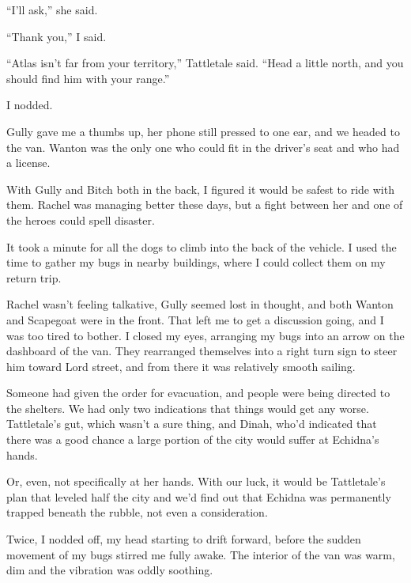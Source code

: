 ``I'll ask,'' she said.



``Thank you,'' I said.



``Atlas isn't far from your territory,'' Tattletale said.  ``Head a little north, and you should find him with your range.''



I nodded.



Gully gave me a thumbs up, her phone still pressed to one ear, and we headed to the van.  Wanton was the only one who could fit in the driver's seat and who had a license.



With Gully and Bitch both in the back, I figured it would be safest to ride with them.  Rachel was managing better these days, but a fight between her and one of the heroes could spell disaster.



It took a minute for all the dogs to climb into the back of the vehicle.  I used the time to gather my bugs in nearby buildings, where I could collect them on my return trip.



Rachel wasn't feeling talkative, Gully seemed lost in thought, and both Wanton and Scapegoat were in the front.  That left me to get a discussion going, and I was too tired to bother.  I closed my eyes, arranging my bugs into an arrow on the dashboard of the van.  They rearranged themselves into a right turn sign to steer him toward Lord street, and from there it was relatively smooth sailing.



Someone had given the order for evacuation, and people were being directed to the shelters.  We had only two indications that things would get any worse.  Tattletale's gut, which wasn't a sure thing, and Dinah, who'd indicated that there was a good chance a large portion of the city would suffer at Echidna's hands.



Or, even, not specifically at her hands.  With our luck, it would be Tattletale's plan that leveled half the city and we'd find out that Echidna was permanently trapped beneath the rubble, not even a consideration.



Twice, I nodded off, my head starting to drift forward, before the sudden movement of my bugs stirred me fully awake.  The interior of the van was warm, dim and the vibration was oddly soothing.




